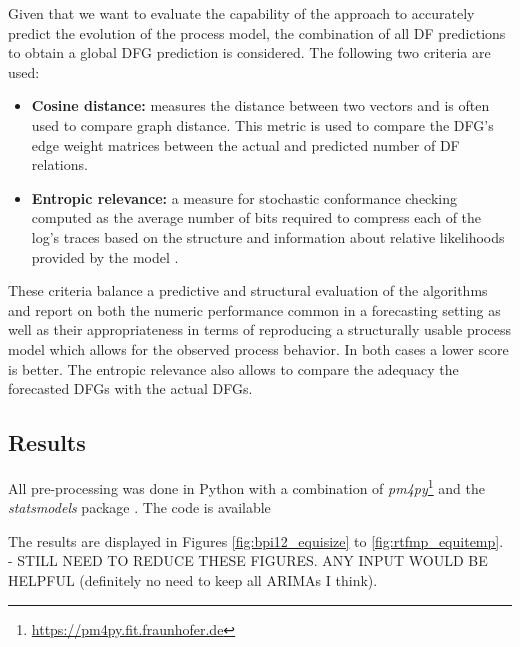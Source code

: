 Given that we want to evaluate the capability of the approach to accurately predict the evolution of the process model, the combination of all DF predictions to obtain a global DFG prediction is considered.
The following two criteria are used:
\begin{itemize}
	\item \textbf{Cosine distance:} measures the distance between two vectors and is often used to compare graph distance. This metric is used to compare the DFG's edge weight matrices between the actual and predicted number of DF relations.
	\item \textbf{Entropic relevance:} a measure for stochastic conformance checking computed as the average number of bits required to compress each of the log’s traces based on the structure and information about relative likelihoods provided by the model \cite{DBLP:conf/icpm/PolyvyanyyMG20}.
\end{itemize}
These criteria balance a predictive and structural evaluation of the algorithms and report on both the numeric performance common in a forecasting setting as well as their appropriateness in terms of reproducing a structurally usable process model which allows for the observed process behavior.
In both cases a lower score is better.
The entropic relevance also allows to compare the adequacy the forecasted DFGs with the actual DFGs.

\subsection{Results}
All pre-processing was done in Python with a combination of \emph{pm4py}\footnote{\url{https://pm4py.fit.fraunhofer.de}} and the \emph{statsmodels} package \cite{seabold2010statsmodels}. 
The code is available %

The results are displayed in Figures \ref{fig:bpi12_equisize} to \ref{fig:rtfmp_equitemp}. - STILL NEED TO REDUCE THESE FIGURES. ANY INPUT WOULD BE HELPFUL (definitely no need to keep all ARIMAs I think).

